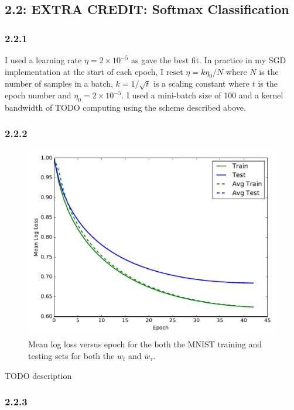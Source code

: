 \documentclass[12pt]{amsart}
\begin{document}
\subsection*{2.2: EXTRA CREDIT: Softmax Classification}

\subsubsection*{2.2.1}

I used a learning rate $\eta = 2 \times 10^{-5}$ as gave the best fit.  In practice in my SGD implementation at the start of each epoch, I reset $\eta = k\eta_0/N$ where $N$ is the number of samples in a batch, $k = 1/\sqrt{t}$ is a scaling constant where $t$ is the epoch number and $\eta_0 = 2 \times 10^{-5}$.  I used a mini-batch size of 100 and a kernel bandwidth of TODO computing using the scheme described above.

\subsubsection*{2.2.2}

\begin{figure}[H]
	\includegraphics[width=\columnwidth]{logistic_log_loss.pdf}
    \caption{Mean log loss versus epoch for the both the MNIST training and testing sets for both the $w_t$ and $\bar{w}_{\tau}$.}
    \label{fig:logistic_log_loss}
\end{figure}

TODO description

\subsubsection*{2.2.3}
\end{document}

